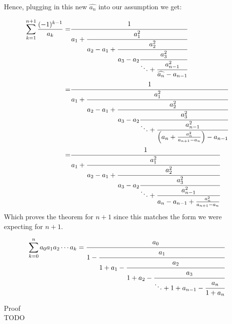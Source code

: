 \documentclass[a4paper]{article}
\begin{document}
\begin{theorem}
        Hence, plugging in this new $\widehat{a_n}$ into our assumption we get:

        \begin{align*}
            \sum_{k=1}^{n+1} \frac{(-1)^{k-1}}{a_k} =& \cfrac{1}{a_1+\cfrac{a_{1}^{2}}{a_2 - a_1 +\cfrac{a_2^2}{a_3 - a_2
            \cfrac{a_3^2}{\ddots + \cfrac{a_{n-1}^2}{\widehat{a_n} - a_{n-1}}}}}}
            \\
            =& \cfrac{1}{a_1+\cfrac{a_{1}^{2}}{a_2 - a_1 +\cfrac{a_2^2}{a_3 - a_2
            \cfrac{a_3^2}{\ddots + \cfrac{a_{n-1}^2}{\Big( a_{n} + \frac{a_n^2}{a_{n+1} - a_{n}} \Big) - a_{n-1}}}}}}
            \\
            =& \cfrac{1}{a_1+\cfrac{a_{1}^{2}}{a_2 - a_1 +\cfrac{a_2^2}{a_3 - a_2
            \cfrac{a_3^2}{\ddots + \cfrac{a_{n-1}^2}{a_{n} - a_{n-1} + \frac{a_n^2}{a_{n+1} - a_{n}} }}}}}
        \end{align*}
        Which proves the theorem for $n+1$ since this matches the form we were expecting for $n+1$.

    \end{theorem}

    \begin{theorem}
        \label{euler_continued_fraction_formula}
        \[
        \sum_{k=0}^{n}  a_0 a_1 a_2 \cdots a_k = \cfrac{a_0}{1 - \cfrac{a_{1}}{1 + a_1 - \cfrac{a_2}{1 + a_2 -
        \cfrac{a_3}{\ddots +  1 + a_{n-1} - \cfrac{a_{n}}{1 + a_n}}}}}
        \]

        Proof\\
        TODO
    \end{theorem}
\end{document}
